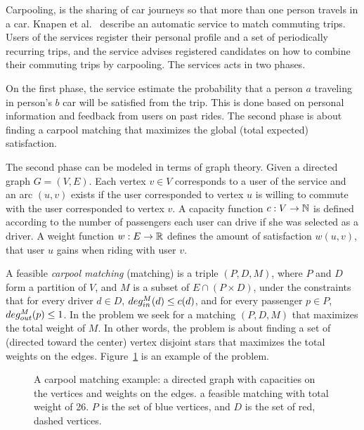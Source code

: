 Carpooling, is the sharing of car journeys so that more than one person travels
in a car.
Knapen et al.~\cite{knapen2013estimating} describe an automatic service
to match commuting trips.
Users of the services register their personal profile and a set of periodically
recurring trips, 
and the service advises registered candidates on how to combine their commuting
trips by carpooling.
The services acts in two phases. 

On the first phase, the service estimate the probability that a person $a$
traveling in person's $b$ car will be satisfied from the trip.
This is done based on personal information and feedback from users on past
rides.
The second phase is about finding a carpool matching
that maximizes the global (total expected) satisfaction.

The second phase can be modeled in terms of graph theory.
Given a directed graph $G = (V, E)$.
Each vertex $v \in V$ corresponds to a user of the service and an arc
$(u, v)$ exists if the user corresponded to vertex $u$ is willing to
commute with the user corresponded to vertex $v$.
A capacity function $ c: V \rightarrow \mathbb{N} $ is defined
according to the number of passengers each user can drive if she was
selected as a driver.
A weight function $w : E \rightarrow \mathbb{R} $ defines the amount of
satisfaction $w(u, v)$,
that user $u$ gains when riding with user $v$.

A feasible \emph{carpool matching} (matching) is a triple 
$(P, D, M)$, where $P$ and $D$ form a partition of $V$, 
and $M$ is a subset of $E \cap (P \times D)$,
under the constraints that for every driver $d \in D$, 
$deg^M_{in}(d) \leq c(d)$, 
and for every passenger $p \in P$, ${deg^M_{out}(p) \leq 1}$.
In the \textsc{\CARPOOL{}} problem we seek for a matching $(P, D, M)$ that maximizes the
total weight of $M$.
In other words, the \textsc{\CARPOOL{}} problem is about finding a set of 
(directed toward the center) vertex disjoint stars 
that maximizes the total weights on the edges.
Figure~\ref{fig:carpool} is an example of the \textsc{\CARPOOL{}} problem.

\begin{figure}
\centering

\caption[]{
\label{fig:carpool}
A carpool matching example: 
a directed graph with capacities on the vertices and weights on the edges. 
a feasible matching with total weight of 26.
$P$ is the set of blue vertices, and $D$ is the set of red, dashed vertices. 
}
\end{figure}  

